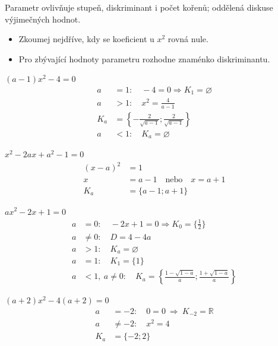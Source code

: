 \documentclass[11pt,a4paper]{article}
\begin{document}
Parametr ovlivňuje stupeň, diskriminant i počet kořenů; oddělená diskuse výjimečných hodnot.
\begin{itemize}
\item Zkoumej nejdříve, kdy se koeficient u $x^2$ rovná nule.
\item Pro zbývající hodnoty parametru rozhodne znaménko diskriminantu.
\end{itemize}
\begin{prikladReseniBox}[title={Příklad 1}]
$(a-1)x^2-4=0$
\tcblower
\[
\begin{aligned}
a&=1:\quad -4=0\Rightarrow K_1=\varnothing\\[2pt]
a&>1:\quad x^2=\frac4{a-1}\\[2pt]
K_a&=\left\{-\frac2{\sqrt{a-1}};\frac2{\sqrt{a-1}}\right\}\\[2pt]
a&<1:\quad K_a=\varnothing
\end{aligned}
\]
\end{prikladReseniBox}
\begin{prikladReseniBox}[title={Příklad 2}]
$x^2-2ax+a^2-1=0$
\tcblower
\[
\begin{aligned}
(x-a)^2&=1\\[2pt]
x&=a-1\quad\text{nebo}\quad x=a+1\\[2pt]
K_a&=\{a-1;a+1\}
\end{aligned}
\]
\end{prikladReseniBox}
\begin{zadaniReseniBox}[title={Samostatná práce 1}]
$ax^2-2x+1=0$
\tcblower
\[
\begin{aligned}
a&=0:\quad -2x+1=0\Rightarrow K_0=\{\tfrac12\}\\[2pt]
a&\ne0:\quad D=4-4a\\[2pt]
a&>1:\quad K_a=\varnothing\\[2pt]
a&=1:\quad K_1=\{1\}\\[2pt]
a&<1,\ a\ne0:\quad K_a=\left\{\frac{1-\sqrt{1-a}}a;\frac{1+\sqrt{1-a}}a\right\}
\end{aligned}
\]
\end{zadaniReseniBox}
\begin{zadaniReseniBox}[title={Samostatná práce 2}]
$(a+2)x^2-4(a+2)=0$
\tcblower
\[
\begin{aligned}
a&=-2:\quad 0=0\ \Rightarrow\ K_{-2}=\mathbb R\\[2pt]
a&\ne-2:\quad x^2=4\\[2pt]
K_a&=\{-2;2\}
\end{aligned}
\]
\end{zadaniReseniBox}
\end{document}
